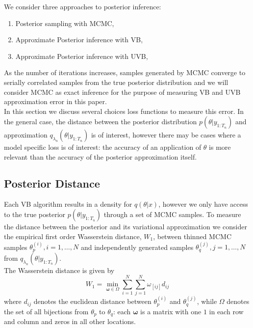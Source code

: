 \documentclass[12pt,a4paper]{article}\usepackage[]{graphicx}\usepackage[]{color}
\begin{document}
We consider three approaches to posterior inference:
\begin{enumerate}
\item Posterior sampling with MCMC,
\item Approximate Posterior inference with VB,
\item Approximate Posterior inference with UVB,
\end{enumerate}

As the number of iterations increases, samples generated by MCMC converge to serially correlated samples from the true posterior distribution and we will consider MCMC as exact inference for the purpose of measuring VB and UVB approximation error in this paper.
\\

In this section we discuss several choices loss functions to measure this error. In the general case, the distance between the posterior distribution $p(\theta | y_{1:T_n})$ and approximation $q_{\lambda_n}(\theta |  y_{1:T_n})$ is of interest, however there may be cases where a model specific loss is of interest: the accuracy of an application of $\theta$ is more relevant than the accuracy of the posterior approximation itself. 


\subsection{Posterior Distance}

Each VB algorithm results in a density for $q(\theta | x)$, however we only have access to the true posterior $p(\theta | y_{1:T_n})$ through a set of MCMC samples. To measure the distance between the posterior and its variational approximation we consider the empirical first order Wasserstein distance, $W_1$, between thinned MCMC samples $\theta^{(i)}_p, i = 1, \dots, N$ and independently generated samples $\theta^{(j)}_q, j = 1, \dots, N$ from $q_{\lambda_n}(\theta |  y_{1:T_n})$.
\\

The Wasserstein distance is given by
\begin{equation}
\label{wasserstein}
W_1 = \underset{\boldsymbol{\omega} \in \Omega}{\min} \sum_{i=1}^N \sum_{j=1}^N \omega_{[ij]} d_{ij}
\end{equation}
where $d_{ij}$ denotes the euclidean distance between $\theta^{(i)}_p$ and $\theta^{(j)}_q$, while $\Omega$ denotes the set of all bijections from $\theta_p$ to $\theta_q$: each $\boldsymbol{\omega}$ is a matrix with one $1$ in each row and column and zeros in all other locations.
\\
\end{document}
